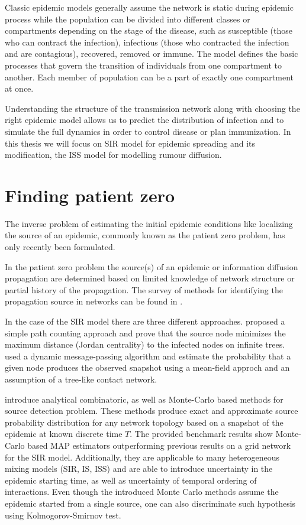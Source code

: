 \documentclass[times, utf8, diplomski]{fer}
\begin{document}
 Classic epidemic models generally  assume the network is static during epidemic process while the population can be divided into different classes or compartments depending on the stage of the disease, such as susceptible (those who can contract the infection), infectious (those who contracted the infection and are contagious), recovered,  removed or immune. The model defines the basic processes that govern the transition of individuals from one compartment to another.
 Each member of population can be a part of exactly one compartment at once. 
 
 Understanding the structure of the transmission network along with choosing the right epidemic model allows us to predict the distribution of infection and to simulate the full dynamics in order to control disease or plan immunization. In this thesis we will focus on SIR model for epidemic spreading and its modification, the ISS model for modelling rumour diffusion. 

\section{Finding patient zero}  
The inverse problem of estimating the initial epidemic conditions like localizing the source of an epidemic, commonly known as the patient zero problem, has only recently been formulated.

In the patient zero problem the source(s) of an epidemic or information diffusion propagation are determined based on limited knowledge of network structure or partial history of the propagation. The survey of methods for identifying the propagation source in networks can be found in \citet{soa_source}.

In the case of the SIR model there are three different approaches. \citet{Zhu} proposed a simple path counting approach and prove that the source node minimizes the maximum distance (Jordan centrality) to the infected nodes on infinite trees. \citet{Lohkov} used a dynamic message-passing algorithm and estimate the probability that a given node produces the observed snapshot using a mean-field approch and an assumption of a tree-like contact network.

\citet{Nino} introduce analytical combinatoric, as well as Monte-Carlo based methods for source detection problem. These methods produce exact and approximate source probability distribution for any network topology based on a snapshot of the epidemic at known discrete time $T$. The provided benchmark results show Monte-Carlo based MAP estimators outperforming previous results on a grid network for the SIR model. Additionally, they are applicable to many heterogeneous mixing models (SIR, IS, ISS) and are able to introduce uncertainty in the epidemic starting time, as well as uncertainty of temporal ordering of interactions. 
Even though the introduced Monte Carlo methods assume the epidemic started from a single source, one can also discriminate such hypothesis using Kolmogorov-Smirnov test.
\end{document}
